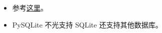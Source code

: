 
\begin{issues}
\issueDraft
\end{issues}


\begin{itemize}
\item 参考\href{https://www.sqlitetutorial.net/sqlite-python/}{这里}。
\item PySQLite 不光支持 SQLite 还支持其他数据库。
\end{itemize}

